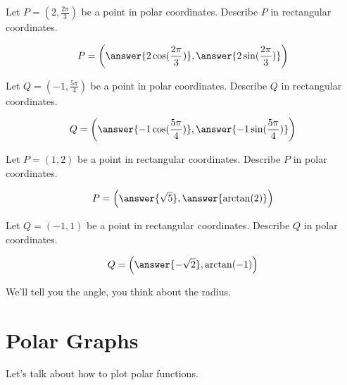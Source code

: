 \documentclass{ximera}
\begin{document}
\begin{question}
  Let $P=\left( 2,\frac{2\pi}{3} \right)$ be a point in polar coordinates. Describe $P$ in
  rectangular coordinates.
  \begin{prompt}
    \[
    P = \left( \answer{2\cos(\frac{2\pi}{3})}, \answer{2\sin(\frac{2\pi}{3})} \right)
    \]
  \end{prompt}
  \begin{question}
  Let $Q=(-1,\frac{5\pi}{4})$ be a point in polar coordinates. Describe $Q$ in
  rectangular coordinates.
  \begin{prompt}
    \[
    Q = \left( \answer{-1\cos(\frac{5\pi}{4})}, \answer{-1\sin(\frac{5\pi}{4})} \right)
    \]
  \end{prompt}
\end{question}
\end{question}

\begin{question}
  Let $P=(1,2)$ be a point in rectangular coordinates. Describe $P$ in
  polar coordinates.
  \begin{prompt}
    \[
    P = \left( \answer{\sqrt{5}}, \answer{\arctan(2)} \right)
    \]
  \end{prompt}
  \begin{question}
  Let $Q=(-1,1)$ be a point in rectangular coordinates. Describe $Q$ in
  polar coordinates.
  \begin{prompt}
    \[
    Q = \left( \answer{-\sqrt{2}}, \arctan(-1) \right)
    \]
    \begin{hint}
      We'll tell you the angle, you think about the radius.
    \end{hint}
  \end{prompt}
\end{question}
\end{question}


















\section{Polar Graphs}

Let's talk about how to plot polar functions.  \\
\end{document}
